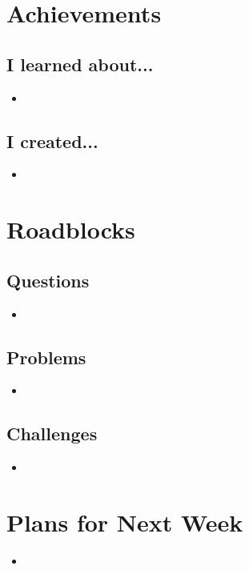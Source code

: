 \documentclass{weeklyreport}
\begin{document}
\section*{Achievements}
\subsection*{I learned about...}
\begin{itemize}
	\item 
\end{itemize}

\subsection*{I created...}
\begin{itemize}
	\item 

\end{itemize}

\pagebreak
\section*{Roadblocks}

\subsection*{Questions}

\begin{itemize}
	\item 
\end{itemize}

\subsection*{Problems}

\begin{itemize}
	\item 
\end{itemize}

\subsection*{Challenges}

\begin{itemize}
    \item 
\end{itemize}

\section*{Plans for Next Week}

\begin{itemize}
	\item 
\end{itemize}
\end{document}
